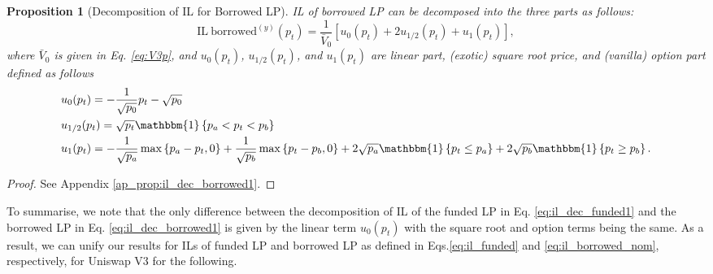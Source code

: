 \documentclass[pdftex,11pt,a4paper] {article}
\newtheorem{proposition}{Proposition}[section]
\begin{document}
\begin{proposition}[Decomposition of IL for Borrowed LP]
\label{prop:il_dec_borrowed1} IL of borrowed LP can be decomposed into the
three parts as follows:
\begin{equation}  \label{eq:il_dec_borrowed1}
\mathrm{IL \ borrowed}^{(y)}(p_{t}) = \frac{1}{\bar{V}_{0}}\left[u_{0}(p_{t}) + 2u_{1/2}(p_{t}) + u_{1}(p_{t})\right],
\end{equation}
where $\bar{V}_{0}$ is given in Eq. \eqref{eq:V3p}, and $u_{0}(p_{t})$, $u_{1/2}(p_{t})$, and $u_{1}(p_{t})$ are linear part,
(exotic) square root price, and (vanilla) option part defined as follows
\begin{equation}  \label{eq:il_dec_borrowed2}
\begin{split}
& u_{0}(p_{t}) = - \frac{1}{\sqrt{p_{0}}} p_{t} - \sqrt{p_{0}} \\
& u_{1/2}(p_{t}) = \sqrt{p_{t}} \mathbbm{1}\left\{ p_{a} < p_{t} <
p_{b}\right\} \\
& u_{1}(p_{t}) = -\frac{1}{\sqrt{p_{a}}} \max\left\{ p_{a}-p_{t}, 0\right\}
+ \frac{1}{\sqrt{p_{b}}} \max\left\{ p_{t}-p_{b}, 0\right\} + 2\sqrt{p_{a}} %
\mathbbm{1}\left\{p_{t}\leq p_{a}\right\} + 2\sqrt{p_{b}}\mathbbm{1}%
\left\{p_{t} \geq p_{b}\right\}.
\end{split}%
\end{equation}
\end{proposition}

\begin{proof}
See Appendix \ref{ap_prop:il_dec_borrowed1}.
\end{proof}

To summarise, we note that the only difference between the decomposition of
IL of the funded LP in Eq. \eqref{eq:il_dec_funded1} and the borrowed LP in Eq. %
\eqref{eq:il_dec_borrowed1} is given by the linear term $u_{0}(p_{t})$ with
the square root and option terms being the same. As a result, we can unify
our results for ILs of funded LP and borrowed LP as defined in Eqs.\eqref{eq:il_funded} and \eqref{eq:il_borrowed_nom}, respectively, for
Uniswap V3 for the following.
\end{document}
